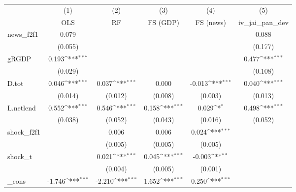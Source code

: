 {
\def\sym#1{\ifmmode^{#1}\else\(^{#1}\)\fi}
\begin{tabular}{l*{5}{c}}
\toprule
            &\multicolumn{1}{c}{(1)}&\multicolumn{1}{c}{(2)}&\multicolumn{1}{c}{(3)}&\multicolumn{1}{c}{(4)}&\multicolumn{1}{c}{(5)}\\
            &\multicolumn{1}{c}{OLS}&\multicolumn{1}{c}{RF}&\multicolumn{1}{c}{FS (GDP)}&\multicolumn{1}{c}{FS (news)}&\multicolumn{1}{c}{iv\_jai\_pan\_dev}\\
\midrule
news\_f2f1   &       0.079         &                     &                     &                     &       0.088         \\
            &     (0.055)         &                     &                     &                     &     (0.177)         \\
\addlinespace
gRGDP       &       0.193\sym{***}&                     &                     &                     &       0.477\sym{***}\\
            &     (0.029)         &                     &                     &                     &     (0.108)         \\
\addlinespace
D.tot       &       0.046\sym{***}&       0.037\sym{***}&       0.000         &      -0.013\sym{***}&       0.040\sym{***}\\
            &     (0.014)         &     (0.012)         &     (0.008)         &     (0.003)         &     (0.013)         \\
\addlinespace
L.netlend   &       0.552\sym{***}&       0.546\sym{***}&       0.158\sym{***}&       0.029\sym{*}  &       0.498\sym{***}\\
            &     (0.038)         &     (0.052)         &     (0.043)         &     (0.016)         &     (0.052)         \\
\addlinespace
shock\_f2f1  &                     &       0.006         &       0.006         &       0.024\sym{***}&                     \\
            &                     &     (0.005)         &     (0.005)         &     (0.005)         &                     \\
\addlinespace
shock\_t     &                     &       0.021\sym{***}&       0.045\sym{***}&      -0.003\sym{**} &                     \\
            &                     &     (0.004)         &     (0.005)         &     (0.001)         &                     \\
\addlinespace
\_cons      &      -1.746\sym{***}&      -2.210\sym{***}&       1.652\sym{***}&       0.250\sym{***}&                     \\

\end{tabular}}
